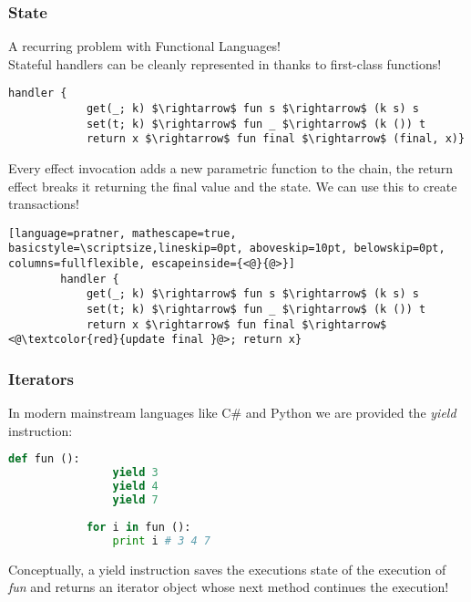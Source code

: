\documentclass[t]{beamer}
\begin{document}
\begin{frame}[fragile]
	\frametitle{State}
	
	A recurring problem with Functional Languages!\\[10pt]
	Stateful handlers can be cleanly represented in \cite{pratner} thanks to first-class functions!
	
	\begin{lstlisting}[language=pratner, mathescape=true, basicstyle=\scriptsize,lineskip=0pt, aboveskip=10pt, belowskip=0pt, columns=fullflexible]
		handler { 
			get(_; k) $\rightarrow$ fun s $\rightarrow$ (k s) s
			set(t; k) $\rightarrow$ fun _ $\rightarrow$ (k ()) t 
			return x $\rightarrow$ fun final $\rightarrow$ (final, x)}
	\end{lstlisting}  
	
	Every effect invocation adds a new parametric function to the chain, the return effect breaks it returning the final value and the state. We can use this to create \alert{transactions}!
		
	\begin{lstlisting}[language=pratner, mathescape=true, basicstyle=\scriptsize,lineskip=0pt, aboveskip=10pt, belowskip=0pt, columns=fullflexible, escapeinside={<@}{@>}]
		handler { 
			get(_; k) $\rightarrow$ fun s $\rightarrow$ (k s) s
			set(t; k) $\rightarrow$ fun _ $\rightarrow$ (k ()) t 
			return x $\rightarrow$ fun final $\rightarrow$ <@\textcolor{red}{update final }@>; return x}
	\end{lstlisting}  
	
	
	\end{frame}

	\begin{frame}[fragile]
		\frametitle{Iterators}
		
		In modern mainstream languages like C\# and Python we are provided the \textit{yield} instruction:
		
		\begin{lstlisting}[language=python, mathescape=true, basicstyle=\scriptsize,lineskip=-2pt, aboveskip=10pt, belowskip=0pt, columns=fullflexible]
			def fun ():
				yield 3
				yield 4
				yield 7
				
			for i in fun ():
				print i # 3 4 7
		\end{lstlisting}
		
		Conceptually, a yield instruction saves the executions state of the execution of \textit{fun} and returns an iterator object whose next method \alert{continues} the execution!
\end{frame}
\end{document}
